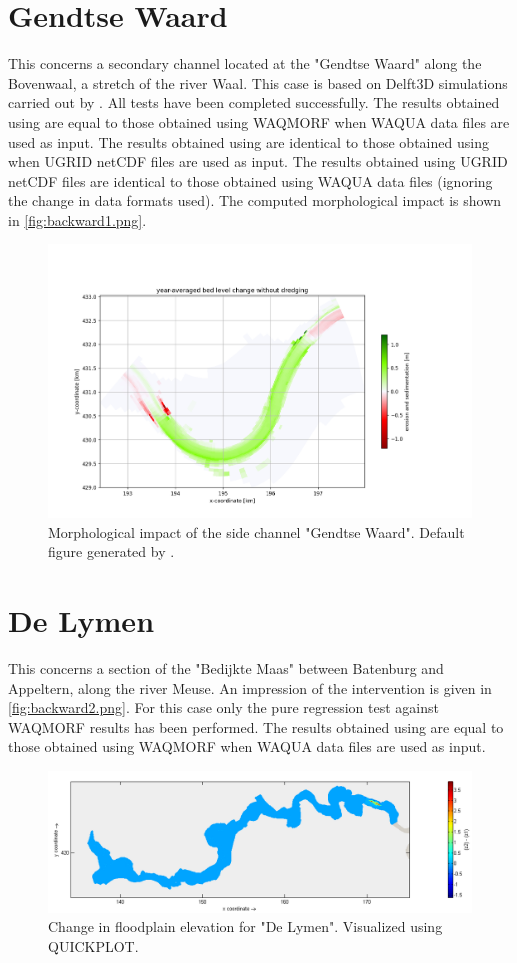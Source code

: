 \section{Gendtse Waard}\label{Sec:GendtseWaard_backward}
This concerns a secondary channel located at the "Gendtse Waard" along the Bovenwaal, a stretch of the river Waal.
This case is based on Delft3D simulations carried out by \citet{Ottevangeretal2016}.
All tests have been completed successfully.
The results obtained using  are equal to those obtained using WAQMORF when WAQUA data files are used as input.
The results obtained using  are identical to those obtained using  when UGRID netCDF files are used as input. 
The results obtained using UGRID netCDF files are identical to those obtained using WAQUA data files (ignoring the change in data formats used).
The computed morphological impact is shown in \autoref{fig:backward1.png}.

\begin{figure}[H]
\center
\includegraphics[width=12cm]{figures/report_Figure1.png}
\caption{Morphological impact of the side channel "Gendtse Waard".
Default figure generated by \dfmi.}
\label{fig:backward1.png}
\end{figure}

\section{De Lymen}\label{Sec:DeLymen_backward}
This concerns a section of the "Bedijkte Maas" between Batenburg and Appeltern, along the river Meuse.
An impression of the intervention is given in \autoref{fig:backward2.png}.
For this case only the pure regression test against WAQMORF results has been performed.
The results obtained using  are equal to those obtained using WAQMORF when WAQUA data files are used as input.

\begin{figure}[H]
\center
\includegraphics[width=12cm]{figures/Lymen_dz.png}
\caption{Change in floodplain elevation for "De Lymen".
Visualized using QUICKPLOT.}
\label{fig:backward2.png}
\end{figure}